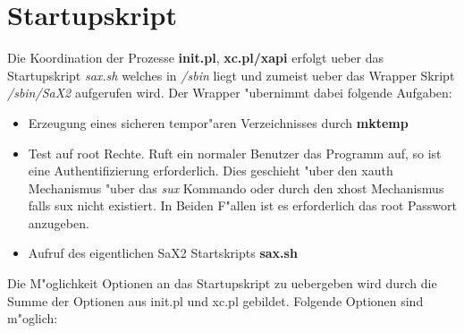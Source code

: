 \section{Startupskript}
\label{sec:sta}
Die Koordination der Prozesse \textbf{init.pl}, \textbf{xc.pl/xapi}
erfolgt ueber das Startupskript \textit{sax.sh} welches in 
\textit{/sbin} liegt und zumeist ueber das Wrapper 
Skript \textit{/sbin/SaX2} aufgerufen wird. Der Wrapper 
"ubernimmt dabei folgende Aufgaben:
\begin{itemize}
\item Erzeugung eines sicheren tempor"aren Verzeichnisses durch \textbf{mktemp} 
\item Test auf root Rechte. Ruft ein normaler Benutzer das Programm auf, so
      ist eine Authentifizierung erforderlich. Dies geschieht "uber den 
      xauth Mechanismus "uber das \textit{sux} Kommando oder durch den xhost
      Mechanismus falls sux nicht existiert. In Beiden F"allen ist es 
      erforderlich das root Passwort anzugeben. 
\item Aufruf des eigentlichen SaX2 Startskripts \textbf{sax.sh}
\end{itemize}
Die M"oglichkeit Optionen an das Startupskript zu uebergeben wird 
durch die Summe der Optionen aus init.pl und xc.pl gebildet.
Folgende Optionen sind m"oglich:
